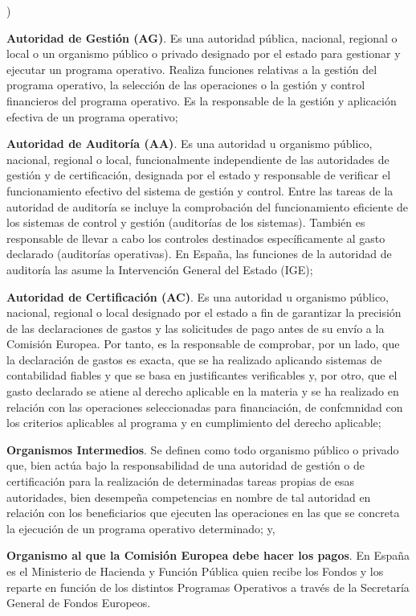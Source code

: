 \documentclass[10pt,a4paper]{article}
\newcounter{alphaitem}
\newenvironment{la}
      {\begin{list}{\alph{alphaitem})}{%
          \usecounter{alphaitem}%
          \setlength{\leftmargin}{1cm}%
          \setlength{\parskip}{3pt}%
          \setlength{\itemsep}{0pt}%
          \setlength{\parsep}{0pt}%
      }}
      {\end{list}}
\begin{document}
\begin{la}
    \item \textbf{Autoridad de Gestión (AG)}. Es una autoridad pública, nacional, regional o local o un organismo público o privado designado por el estado para gestionar y ejecutar un programa operativo. Realiza funciones relativas a la gestión del programa operativo, la selección de las operaciones o la gestión y control financieros del programa operativo. Es la responsable de la gestión y aplicación efectiva de un programa operativo;
    \item \textbf{Autoridad de Auditoría (AA)}. Es una autoridad u organismo público, nacional, regional o local, funcionalmente independiente de las autoridades de gestión y de certificación, designada por el estado y responsable de verificar el funcionamiento efectivo del sistema de gestión y control. Entre las tareas de la autoridad de auditoría se incluye la comprobación del funcionamiento eficiente de los sistemas de control y gestión (auditorías de los sistemas). También es responsable de llevar a cabo los controles destinados específicamente al gasto declarado (auditorías operativas). En España, las funciones de la autoridad de auditoría las asume la Intervención General del Estado (IGE);
    \item \textbf{Autoridad de Certificación (AC)}. Es una autoridad u organismo público, nacional, regional o local designado por el estado a fin de garantizar la precisión de las declaraciones de gastos y las solicitudes de pago antes de su envío a la Comisión Europea. Por tanto, es la responsable de comprobar, por un lado, que la declaración de gastos es exacta, que se ha realizado aplicando sistemas de contabilidad fiables y que se basa en justificantes verificables y, por otro, que el gasto declarado se atiene al derecho aplicable en la materia y se ha realizado en relación con las operaciones seleccionadas para financiación, de confcmnidad con los criterios aplicables al programa y en cumplimiento del derecho aplicable; 
    \item \textbf{Organismos Intermedios}. Se definen como todo organismo público o privado que, bien actúa bajo la responsabilidad de una autoridad de gestión o de certificación para la realización de determinadas tareas propias de esas autoridades, bien desempeña competencias en nombre de tal autoridad en relación con los beneficiarios que ejecuten las operaciones en las que se concreta la ejecución de un programa operativo determinado; y,
    \item \textbf{Organismo al que la Comisión Europea debe hacer los pagos}. En España es el Ministerio de Hacienda y Función Pública quien recibe los Fondos y los reparte en función de los distintos Programas Operativos a través de la Secretaría General de Fondos Europeos.
\end{la}
\end{document}
